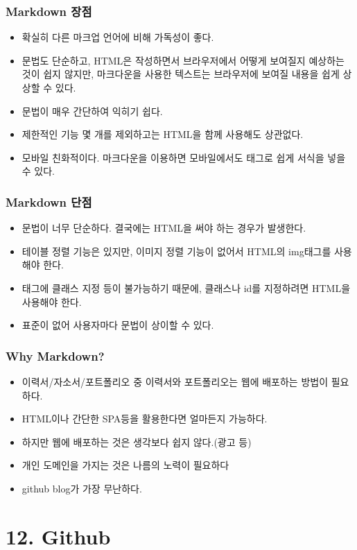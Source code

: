 \documentclass{article}
\begin{document}
\subsubsection{Markdown 장점}
\begin{itemize}
    \item 확실히 다른 마크업 언어에 비해 가독성이 좋다.
    \item 문법도 단순하고, HTML은 작성하면서 브라우저에서 어떻게 보여질지 예상하는 것이 쉽지 않지만, 마크다운을 사용한 텍스트는 브라우저에 보여질 내용을 쉽게 상상할 수 있다.
    \item 문법이 매우 간단하여 익히기 쉽다.
    \item 제한적인 기능 몇 개를 제외하고는 HTML을 함께 사용해도 상관없다.
    \item 모바일 친화적이다. 마크다운을 이용하면 모바일에서도 태그로 쉽게 서식을 넣을 수 있다.
\end{itemize}
\subsubsection{Markdown 단점}
\begin{itemize}
    \item 문법이 너무 단순하다. 결국에는 HTML을 써야 하는 경우가 발생한다.
    \item 테이블 정렬 기능은 있지만, 이미지 정렬 기능이 없어서 HTML의 img태그를 사용해야 한다.
    \item 태그에 클래스 지정 등이 불가능하기 때문에, 클래스나 id를 지정하려면 HTML을 사용해야 한다.
    \item 표준이 없어 사용자마다 문법이 상이할 수 있다.
\end{itemize}
\subsubsection{Why Markdown?}
\begin{itemize}
    \item 이력서/자소서/포트폴리오 중 이력서와 포트폴리오는 웹에 배포하는 방법이 필요하다.
    \item HTML이나 간단한 SPA등을 활용한다면 얼마든지 가능하다.
    \item 하지만 웹에 배포하는 것은 생각보다 쉽지 않다.(광고 등)
    \item 개인 도메인을 가지는 것은 나름의 노력이 필요하다
    \item github blog가 가장 무난하다.
\end{itemize}

\section{12. Github}
\end{document}
